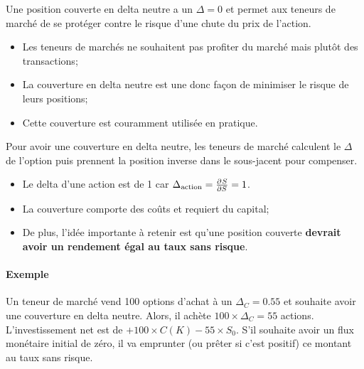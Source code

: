 \documentclass[10pt, french]{article}
\begin{document}
\begin{multicols*}{2}
\begin{definitionNOHFILLsub}
Une position couverte en delta neutre a un $\Delta = 0$ et permet aux teneurs de marché de se protéger contre le risque d'une chute du prix de l'action.

\begin{rappel_enhanced}[Contexte]
\begin{itemize}[leftmargin = *]
	\item	Les teneurs de marchés ne souhaitent pas profiter du marché mais plutôt des transactions;
	\item	La couverture en delta neutre est une donc façon de minimiser le risque de leurs positions;
	\item	Cette couverture est couramment utilisée en pratique.
\end{itemize}
\end{rappel_enhanced}

Pour avoir une couverture en delta neutre, les teneurs de marché calculent le $\Delta$ de l'option puis prennent la position inverse dans le sous-jacent pour compenser. 
\begin{itemize}[leftmargin = *]
	\item	Le delta d'une action est de 1 car $\Delta_{\text{action}}	=	\frac{\partial^{}S}{\partial S^{}} = 1$.
	\item	La couverture comporte des coûts et requiert du capital;
	\item	De plus, l'idée importante à retenir est qu'une position couverte \textbf{devrait avoir un rendement égal au taux sans risque}.
\end{itemize}

\paragraph{Exemple}	Un teneur de marché vend 100 options d'achat à un $\Delta_{C} = 0.55$ et souhaite avoir une couverture en delta neutre. Alors, il achète $100 \times \Delta_{C} = 55$ actions. L'investissement net est de $ + 100 \times C(K) - 55 \times S_{0}$. S'il souhaite avoir un flux monétaire initial de zéro, il va emprunter (ou prêter si c'est positif) ce montant au taux sans risque.
\end{definitionNOHFILLsub}


\end{multicols*}
\end{document}
